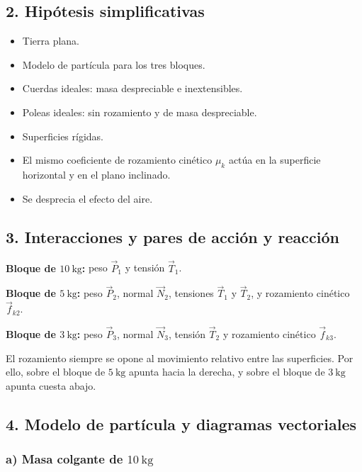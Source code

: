 \documentclass[12pt]{article}
\newcommand{\paso}[2]{%
  \subsection*{\color{AzulFisica}#1. #2}%
}
\begin{document}
\paso{2}{Hipótesis simplificativas}
\begin{itemize}[itemsep=2pt]
  \item Tierra plana.
  \item Modelo de partícula para los tres bloques.
  \item Cuerdas ideales: masa despreciable e inextensibles.
  \item Poleas ideales: sin rozamiento y de masa despreciable.
  \item Superficies rígidas.
  \item El mismo coeficiente de rozamiento cinético $\mu_k$ actúa en la superficie horizontal y en el plano inclinado.
  \item Se desprecia el efecto del aire.
\end{itemize}

\paso{3}{Interacciones y pares de acción y reacción}
\textbf{Bloque de $\SI{10}{\kilogram}$:} peso $\vec P_1$ y tensión $\vec T_1$.

\textbf{Bloque de $\SI{5}{\kilogram}$:} peso $\vec P_2$, normal $\vec N_2$, tensiones $\vec T_1$ y $\vec T_2$, y rozamiento cinético $\vec f_{k2}$.

\textbf{Bloque de $\SI{3}{\kilogram}$:} peso $\vec P_3$, normal $\vec N_3$, tensión $\vec T_2$ y rozamiento cinético $\vec f_{k3}$.

El rozamiento siempre se opone al movimiento relativo entre las superficies. Por ello, sobre el bloque de $\SI{5}{\kilogram}$ apunta hacia la derecha, y sobre el bloque de $\SI{3}{\kilogram}$ apunta cuesta abajo.

\paso{4}{Modelo de partícula y diagramas vectoriales}

\subsubsection*{a) Masa colgante de $\SI{10}{\kilogram}$}
\begin{center}
\end{center}
\end{document}
